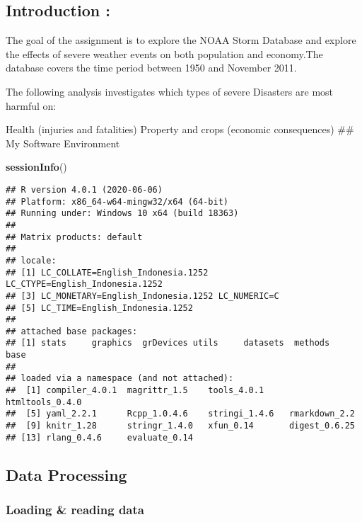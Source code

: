 \documentclass[
]{article}
\author{Xwyzworm}
\date{}
\newenvironment{Shaded}{\begin{snugshade}}{\end{snugshade}}
\newcommand{\KeywordTok}[1]{\textcolor[rgb]{0.13,0.29,0.53}{\textbf{#1}}}
\newcommand{\NormalTok}[1]{#1}
\begin{document}
\hypertarget{introduction}{%
\subsection{Introduction :}\label{introduction}}

The goal of the assignment is to explore the NOAA Storm Database and
explore the effects of severe weather events on both population and
economy.The database covers the time period between 1950 and November
2011.

The following analysis investigates which types of severe Disasters are
most harmful on:

Health (injuries and fatalities) Property and crops (economic
consequences) \#\# My Software Environment

\begin{Shaded}
\begin{Highlighting}[]
\KeywordTok{sessionInfo}\NormalTok{()}
\end{Highlighting}
\end{Shaded}

\begin{verbatim}
## R version 4.0.1 (2020-06-06)
## Platform: x86_64-w64-mingw32/x64 (64-bit)
## Running under: Windows 10 x64 (build 18363)
## 
## Matrix products: default
## 
## locale:
## [1] LC_COLLATE=English_Indonesia.1252  LC_CTYPE=English_Indonesia.1252   
## [3] LC_MONETARY=English_Indonesia.1252 LC_NUMERIC=C                      
## [5] LC_TIME=English_Indonesia.1252    
## 
## attached base packages:
## [1] stats     graphics  grDevices utils     datasets  methods   base     
## 
## loaded via a namespace (and not attached):
##  [1] compiler_4.0.1  magrittr_1.5    tools_4.0.1     htmltools_0.4.0
##  [5] yaml_2.2.1      Rcpp_1.0.4.6    stringi_1.4.6   rmarkdown_2.2  
##  [9] knitr_1.28      stringr_1.4.0   xfun_0.14       digest_0.6.25  
## [13] rlang_0.4.6     evaluate_0.14
\end{verbatim}

\hypertarget{data-processing}{%
\subsection{Data Processing}\label{data-processing}}

\hypertarget{loading-reading-data}{%
\subsubsection{Loading \& reading data}\label{loading-reading-data}}
\end{document}
